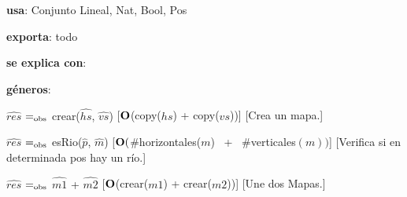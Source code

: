\begin{Interfaz}
  
    \textbf{usa}: Conjunto Lineal, Nat, Bool, Pos

    \textbf{exporta}: todo 

    \textbf{se explica con}: 
  
    \textbf{géneros}: 
  
  
    {$\hat{res}$ $=_{\mathrm{obs}}$ crear($\hat{hs}$, $\hat{vs}$)}%
    [$\bold{O}$(copy($hs$) + copy($vs$))] 
    [Crea un mapa.]

    {$\hat{res}$ $=_{\mathrm{obs}}$ esRio($\hat{p}$, $\hat{m}$)}%
    [$\bold{O}($\#horizontales($m$) \ + \  \#verticales$(m))$]
    [Verifica si en determinada pos hay un río.] 

    {$\hat{res}$ $=_{\mathrm{obs}}$ $\hat{m1}$ + $\hat{m2}$}%
    [$\bold{O}$(crear($m1$) + crear($m2$))]
    [Une dos Mapas.] 

  \end{Interfaz}